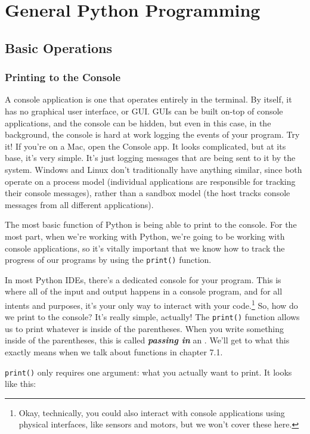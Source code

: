 \chapter{General Python Programming}
\section{Basic Operations}
\subsection{Printing to the Console}
A console application is one that operates entirely in the terminal. By itself, it has no graphical user interface, or GUI. GUIs can be built on-top of console applications, and the console can be hidden, but even in this case, in the background, the console is hard at work logging the events of your program. Try it! If you're on a Mac, open the Console app. It looks complicated, but at its base, it's very simple. It's just logging messages that are being sent to it by the system. Windows and Linux don't traditionally have anything similar, since both operate on a process model (individual applications are responsible for tracking their console messages), rather than a sandbox model (the host tracks console messages from all different applications).\par
The most basic function of Python is being able to print to the console. For the most part, when we're working with Python, we're going to be working with console applications, so it's vitally important that we know how to track the progress of our programs by using the \verb|print()| function.\par
In most Python IDEs, there's a dedicated console for your program. This is where all of the input and output happens in a console program, and for all intents and purposes, it's your only way to interact with your code.\footnote{Okay, technically, you could also interact with console applications using physical interfaces, like sensors and motors, but we won't cover these here.} So, how do we print to the console? It's really simple, actually! The \verb|print()| function allows us to print whatever is inside of the parentheses. When you write something inside of the parentheses, this is called \textbf{\textit{passing in}} an . We'll get to what this exactly means when we talk about functions in chapter 7.1.\par
\verb|print()| only requires one argument: what you actually want to print. It looks like this:
